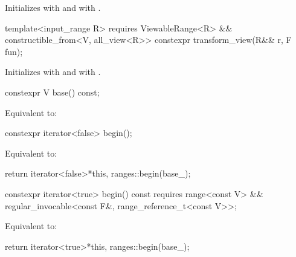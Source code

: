 \begin{itemdescr}
\pnum
\effects Initializes  with  and
 with .
\end{itemdescr}

%
\begin{itemdecl}
template<input_range R>
  requires ViewableRange<R> && constructible_from<V, all_view<R>>
constexpr transform_view(R&& r, F fun);
\end{itemdecl}

\begin{itemdescr}
\pnum
\effects Initializes  with 
and  with .
\end{itemdescr}

%
\begin{itemdecl}
constexpr V base() const;
\end{itemdecl}

\begin{itemdescr}
\pnum
\effects Equivalent to: 
\end{itemdescr}

%
\begin{itemdecl}
constexpr iterator<false> begin();
\end{itemdecl}

\begin{itemdescr}
\pnum
\effects Equivalent to:
\begin{codeblock}
return iterator<false>{*this, ranges::begin(base_)};
\end{codeblock}
\end{itemdescr}

%
\begin{itemdecl}
constexpr iterator<true> begin() const
  requires range<const V> &&
           regular_invocable<const F&, range_reference_t<const V>>;
\end{itemdecl}

\begin{itemdescr}
\pnum
\effects Equivalent to:
\begin{codeblock}
return iterator<true>{*this, ranges::begin(base_)};
\end{codeblock}
\end{itemdescr}


